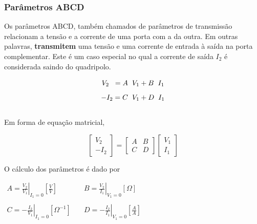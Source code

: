 \documentclass{article}
\numberwithin{equation}{section}
\begin{document}
\subsubsection{Parâmetros ABCD}
\label{subsubsec:quadripolostransm}
Os parâmetros ABCD, também chamados de parâmetros de transmissão relacionam a tensão e a corrente de uma porta com a da outra. Em outras palavras, \textbf{transmitem} uma tensão e uma corrente de entrada à saída na porta complementar. Este é um caso especial no qual a corrente de saída $I_{2}$ é considerada saindo do quadripolo.

\begin{equation*}
    V_{2} \hspace{0.2cm} =A \hspace{0.2cm} V_{1}+ B \hspace{0.2cm} I_{1}
\end{equation*}
\begin{equation*}
    -I_{2}=C \hspace{0.2cm} V_{1}+D \hspace{0.2cm} I_{1}
\end{equation*}\\
Em forma de equação matricial,

\begin{equation}
    \begin{bmatrix}
        V_{2} \\
        -I_{2}
    \end{bmatrix}
    = %
    \begin{bmatrix}
        A & B \\
        C & D
    \end{bmatrix}
    \begin{bmatrix}
        V_{1} \\
        I_{1}
    \end{bmatrix}
\end{equation}

\noindent O cálculo dos parâmetros é dado por
\begin{center}
    $\begin{matrix} %
            A=\displaystyle\left.\frac{V_{2}}{V_{1}}\right|_{I_{1}=0} \left[\frac{V}{V}\right] &\quad B=\displaystyle\left.\frac{V_{2}}{I_{1}}\right|_{V_{1}=0}[\Omega]\\\\
            C=\displaystyle\left.-\frac{I_{2}}{V_{1}}\right|_{I_{1}=0}[\Omega^{-1}]&\quad
            D=\displaystyle\left.-\frac{I_{2}}{I_{1}}\right|_{V_{1}=0}\left[\frac{A}{A}\right]
    \end{matrix}$
\end{center}
\end{document}
